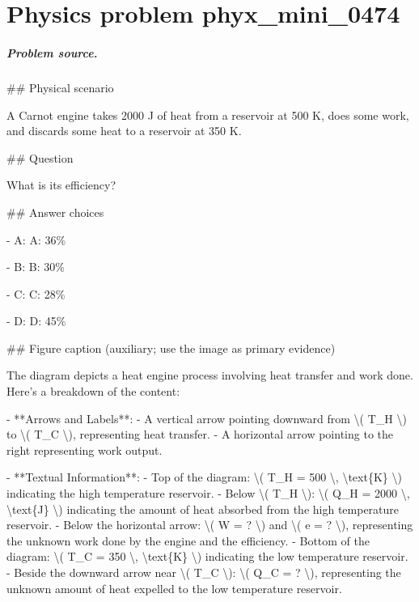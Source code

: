 
\chapter{Physics problem phyx\_mini\_0474}
\label{ch:PhyXMiniProblems_problem_phyx_mini_0474}

\paragraph{Problem source.}
\#\# Physical scenario

A Carnot engine takes 2000 J of heat from a reservoir at 500 K, does some work, and discards some heat to a reservoir at 350 K.

\#\# Question

What is its efficiency?

\#\# Answer choices

- A: A: 36\%

- B: B: 30\%

- C: C: 28\%

- D: D: 45\%

\#\# Figure caption (auxiliary; use the image as primary evidence)

The diagram depicts a heat engine process involving heat transfer and work done. Here's a breakdown of the content:

- **Arrows and Labels**:
  - A vertical arrow pointing downward from \textbackslash{}( T\_H \textbackslash{}) to \textbackslash{}( T\_C \textbackslash{}), representing heat transfer.
  - A horizontal arrow pointing to the right representing work output.

- **Textual Information**:
  - Top of the diagram: \textbackslash{}( T\_H = 500 \textbackslash{}, \textbackslash{}text\{K\} \textbackslash{}) indicating the high temperature reservoir.
  - Below \textbackslash{}( T\_H \textbackslash{}): \textbackslash{}( Q\_H = 2000 \textbackslash{}, \textbackslash{}text\{J\} \textbackslash{}) indicating the amount of heat absorbed from the high temperature reservoir.
  - Below the horizontal arrow: \textbackslash{}( W = ? \textbackslash{}) and \textbackslash{}( e = ? \textbackslash{}), representing the unknown work done by the engine and the efficiency.
  - Bottom of the diagram: \textbackslash{}( T\_C = 350 \textbackslash{}, \textbackslash{}text\{K\} \textbackslash{}) indicating the low temperature reservoir.
  - Beside the downward arrow near \textbackslash{}( T\_C \textbackslash{}): \textbackslash{}( Q\_C = ? \textbackslash{}), representing the unknown amount of heat expelled to the low temperature reservoir.

